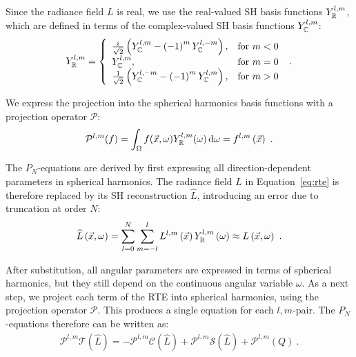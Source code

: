 Since the radiance field $L$ is real, we use the real-valued SH basis functions $Y_{\mathbb{R}}^{l,m}$, which are defined in terms of the complex-valued SH basis functions $Y_{\mathbb{C}}^{l,m}$:
\begin{align}
Y_{\mathbb{R}}^{l,m}=
\left\{
\begin{array}{lr}
\frac{{i\mkern1mu}}{\sqrt{2}}\left(Y_{\mathbb{C}}^{l,m}-\left(-1\right)^mY_{\mathbb{C}}^{l,-m}\right), & \text{for } m < 0\\
Y_{\mathbb{C}}^{l,m}, & \text{for } m = 0\\
\frac{1}{\sqrt{2}}\left(Y_{\mathbb{C}}^{l,-m}-\left(-1\right)^mY_{\mathbb{C}}^{l,m}\right), & \text{for } m > 0
\end{array}
\right.
\ .
\label{eq:sh_real_basis}
\end{align}

We express the projection into the spherical harmonics basis functions with a projection operator $\mathcal{P}$:
\begin{align}
\mathcal{P}^{l, m}(f) = \int_{\Omega}f(\vec{x}, \omega) Y_{\mathbb{R}}^{l,m}(\omega)\,\mathrm{d}\omega = f^{l,m}\left(\vec{x}\right)
\ .
\nonumber
\end{align}

The $P_N$-equations are derived by first expressing all direction-dependent parameters in spherical harmonics. The radiance field $L$ in Equation~\ref{eq:rte} is therefore replaced by its SH reconstruction $\widehat{L}$, introducing an error due to truncation at order $N$:
\begin{align}
\widehat{L}\left(\vec{x}, \omega\right) =
\sum_{l=0}^{N}
{
\sum_{m=-l}^{l}
{
L^{l,m}\left(\vec{x}\right)Y_{\mathbb{R}}^{l,m}\left(\omega\right)
}
}
\approx
L\left(\vec{x}, \omega\right)
\ .
\nonumber
\end{align}

\vspace{0.5in}

After substitution, all angular parameters are expressed in terms of spherical harmonics, but they still depend on the continuous angular variable $\omega$. As a next step, we project each term of the RTE into spherical harmonics, using the projection operator $\mathcal{P}$. This produces a single equation for each $l,m$-pair. The $P_N$-equations therefore can be written as:
\begin{align}
\mathcal{P}^{l,m}\mathcal{T}\left(\widehat{L}\right)
=
-\mathcal{P}^{l,m}\mathcal{C}\left(\widehat{L}\right) 
+\mathcal{P}^{l,m}\mathcal{S}\left(\widehat{L}\right)
+\mathcal{P}^{l,m}\left(Q\right)
\ .
\label{eq:pn_operator_notation}
\end{align}

